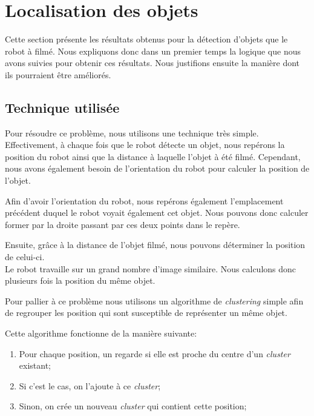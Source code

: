\documentclass[10pt,a4paper]{article}
\begin{document}
   
   	\section{Localisation des objets}
   	
   		Cette section présente les résultats obtenus pour la détection d'objets que le robot à filmé. Nous expliquons donc dans un premier temps la logique que nous avons suivies pour obtenir ces résultats. Nous justifions ensuite la manière dont ils pourraient être améliorés.
   		
   		\subsection{Technique utilisée}
   		
   			Pour résoudre ce problème, nous utilisons une technique très simple. Effectivement, à chaque fois que le robot détecte un objet, nous repérons la position du robot ainsi que la distance à laquelle l'objet à été filmé. Cependant, nous avons également besoin de l'orientation du robot pour calculer la position de l'objet.
   			
   			Afin d'avoir l'orientation du robot, nous repérons également l'emplacement précédent duquel le robot voyait également cet objet. Nous pouvons donc calculer former par la droite passant par ces deux points dans le repère.
   			
   			Ensuite, grâce à la distance de l'objet filmé, nous pouvons déterminer la position de celui-ci.\\
   			
   			Le robot travaille sur un grand nombre d'image similaire. Nous calculons donc plusieurs fois la position du même objet.
   			
   			Pour pallier à ce problème nous utilisons un algorithme de \textit{clustering} simple afin de regrouper les position qui sont susceptible de représenter un même objet.
   			
   			Cette algorithme fonctionne de la manière suivante:
   			\begin{enumerate}
   				\item Pour chaque position, un regarde si elle est proche du centre d'un \textit{cluster} existant;
   				\item Si c'est le cas, on l'ajoute à ce \textit{cluster};
   				\item Sinon, on crée un nouveau \textit{cluster} qui contient cette position;
   			\end{enumerate}
   		
\end{document}
